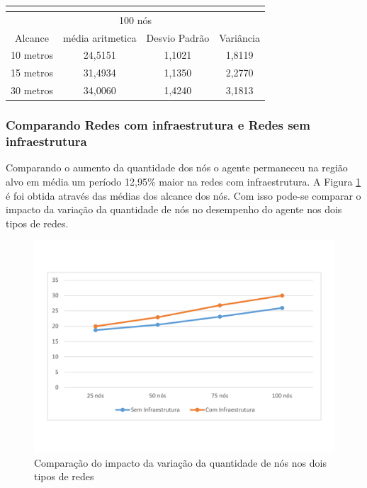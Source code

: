 \begin{table}[!htb]
\begin{minipage}{.5\linewidth}
\begin{tabular}{|c|c|c|c|}
			\multicolumn{4}{|c|}{} \\ \hline


			\multicolumn{4}{|c|}{100 nós} \\ \hline
			Alcance   & média aritmetica &	Desvio Padrão &	Variância  \\ \hline
			10 metros &	24,5151 & 1,1021 & 1,8119  \\ \hline
			15 metros &	31,4934 & 1,1350 & 2,2770  \\ \hline
			30 metros &	34,0060 & 1,4240 & 3,1813 \\ \hline

		\end{tabular}

	    \end{minipage} 
	\end{table}  


\subsubsection{Comparando Redes com infraestrutura e Redes sem infraestrutura}

Comparando o aumento da quantidade dos nós o agente permaneceu na região alvo em média um período 12,95\% maior na redes com infraestrutura. A Figura \ref{fig:comparacaoVariacaoNos} é foi obtida através das médias dos alcance dos nós. Com isso pode-se comparar o impacto da variação da quantidade de nós no desempenho do agente nos dois tipos de redes. 

\begin{figure}[htbp]
	\centering
	\includegraphics[scale=0.34]{resultados/graficos/comparacaoVariacaoNos.pdf}
	\caption{Comparação do impacto da variação da quantidade de nós nos dois tipos de redes}
	\label{fig:comparacaoVariacaoNos}
\end{figure}  

